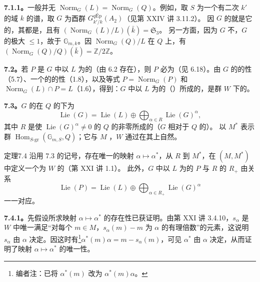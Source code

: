 \textbf{7.1.1。}一般并无 $\operatorname{Norm}_G(L)=\operatorname{Norm}_G(Q)$。例如，取 $S$ 为一个有二次 $k'$ 的域 $k$ 的谱，取 $G$ 为酉群 $G^{q\mathrm{\text{É}p}}_{k'/k}(A_2)$（见第 XXIV 讲 3.11.2）。
因 $G$ 的就是它的，其都是，且有 $(\operatorname{Norm}_G(L)/L)(\bar k)=\mathfrak S_3$。
另一方面，因为 $G$ 不，$G$ 的极大 $\leq1$，故于 $\mathbb G_{m,k}$。因 $\operatorname{Norm}_G(Q)/L$ 在 $Q$ 上，有 $(\operatorname{Norm}_G(Q)/Q)(\bar k)=\mathbb Z/2\mathbb Z$。

\textbf{7.2。}若 $P$ 是 $G$ 中以 $L$ 为的（由 6.2 存在），则 $P$ 必为（见 6.18）。由 $G$ 的的性（5.7）、一个的的性（1.8），以及等式 $P=\operatorname{Norm}_G(P)$ 和 $\operatorname{Norm}_G(L)\cap P=L$（1.6），得到：$G$ 中以 $L$ 为的（）所成的，是群 $W$ 下的。

\textbf{7.3。}$G$ 的在 $Q$ 的下为
\[
 \operatorname{Lie}(G)=\operatorname{Lie}(L)\oplus\bigoplus_{\alpha\in R}\operatorname{Lie}(G)^\alpha,
\]
其中 $R$ 是使 $\operatorname{Lie}(G)^\alpha\neq0$ 的 $Q$ 的非零所成的（$G$ 相对于 $Q$ 的）。
以 $M^*$ 表示群 $\operatorname{Hom}_{S\text{-gr}}(\mathbb G_{m,S},Q)$；它与 $M$ ，$W$ 通过在其上自然。
\begin{SGAresult}{定理}{7.4}
沿用 7.3 的记号，存在唯一的映射 $\alpha\mapsto\alpha^*$，从 $R$ 到 $M^*$，在 $(M,M^*)$ 中定义一个为 $W$ 的（第 XXI 讲 1.1）。
此外，$G$ 中以 $L$ 为的 $P$ 与 $R$ 的 $R_+$ 由关系
\[
 \operatorname{Lie}(P)=\operatorname{Lie}(L)\oplus\bigoplus_{\alpha\in R_+}\operatorname{Lie}(G)^\alpha
\]
一一对应。
\end{SGAresult}
\textbf{7.4.1。}先假设所求映射 $\alpha\mapsto\alpha^*$ 的存在性已获证明。由第 XXI 讲 3.4.10，$s_\alpha$ 是 $W$ 中唯一满足“对每个 $m\in M$，$s_\alpha(m)-m$ 为 $\alpha$ 的有理倍数”的元素，这说明 $s_\alpha$ 由 $\alpha$ 决定。因这时有\footnote{编者注：已将 $\alpha^*(m)$ 改为 $\alpha^*(m)\alpha$。}$\alpha^*(m)\alpha=m-s_\alpha(m)$，可见 $\alpha^*$ 由 $\alpha$ 决定，从而证明了映射 $\alpha\mapsto\alpha^*$ 的唯一性。

